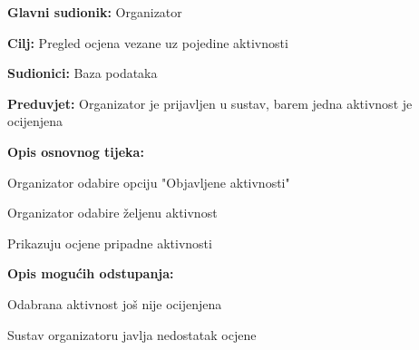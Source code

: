 					\noindent {}
					\begin{packed_item}
						
						\item \textbf{Glavni sudionik: }Organizator
						\item  \textbf{Cilj:} Pregled ocjena vezane uz pojedine aktivnosti
						\item  \textbf{Sudionici:} Baza podataka
						\item  \textbf{Preduvjet:} Organizator je prijavljen u sustav, barem jedna aktivnost je ocijenjena
						\item  \textbf{Opis osnovnog tijeka:}
						
						\item[] \begin{packed_enum}
							
							\item Organizator odabire opciju "Objavljene aktivnosti"
							\item Organizator odabire željenu aktivnost
							\item Prikazuju ocjene pripadne aktivnosti

						\end{packed_enum}
						
						\item  \textbf{Opis mogućih odstupanja:}
						
						\item[] \begin{packed_item}
							
							\item[2.a] Odabrana aktivnost još nije ocijenjena
							\item[] \begin{packed_enum}
								
								\item Sustav organizatoru javlja nedostatak ocjene
								
							\end{packed_enum}
							
						\end{packed_item}
					\end{packed_item}										
				
